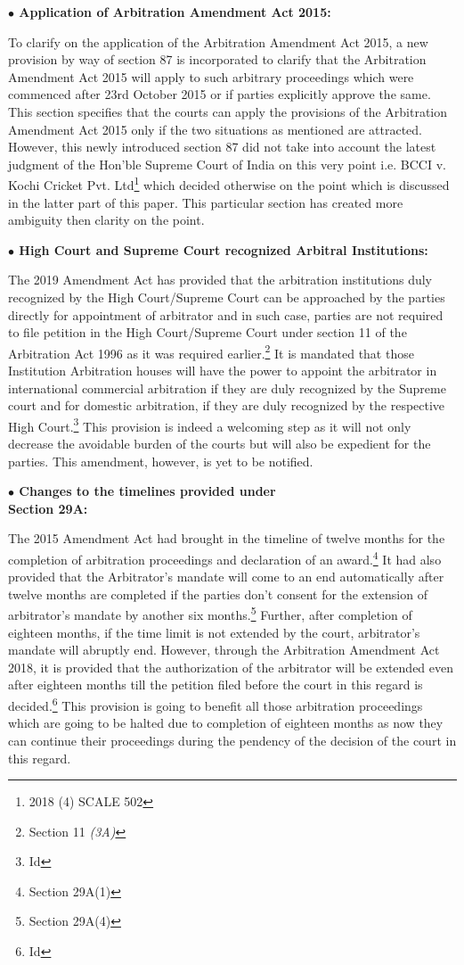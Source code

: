 \begin{multicols}{2}
\noi
{\large \bfseries $\bullet$ Application of Arbitration Amendment Act 2015:}

\noi
To clarify on the application of the Arbitration Amendment Act 2015, a new provision by
way of section 87 is incorporated to clarify that the Arbitration Amendment Act 2015 will
apply to such arbitrary proceedings which were commenced after 23rd October 2015 or if
parties explicitly approve the same. This section specifies that the courts can apply the
provisions of the Arbitration Amendment Act 2015 only if the two situations as mentioned 
are attracted. However, this newly introduced section 87 did not take into account the latest
judgment of the Hon’ble Supreme Court of India on this very point i.e. BCCI v. Kochi
Cricket Pvt. Ltd\footnote{2018 (4) SCALE 502} which decided otherwise on the point which is discussed in the latter part
of this paper. This particular section has created more ambiguity then clarity on the point.

\noi
{\large \bfseries $\bullet$ High Court and Supreme Court recognized Arbitral Institutions:}

\noi
The 2019 Amendment Act has provided that the arbitration institutions duly recognized by
the High Court/Supreme Court can be approached by the parties directly for appointment of
arbitrator and in such case, parties are not required to file petition in the High Court/Supreme
Court under section 11 of the Arbitration Act 1996 as it was required earlier.\footnote{Section 11 \textit{(3A)}} It is mandated
that those Institution Arbitration houses will have the power to appoint the arbitrator in
international commercial arbitration if they are duly recognized by the Supreme court and for
domestic arbitration, if they are duly recognized by the respective High Court.\footnote{Id} This
provision is indeed a welcoming step as it will not only decrease the avoidable burden of the
courts but will also be expedient for the parties. This amendment, however, is yet to be
notified.

\noi
{\large \bfseries $\bullet$ Changes to the timelines provided under\\ Section 29A:}

\noi
The 2015 Amendment Act had brought in the timeline of twelve months for the completion
of arbitration proceedings and declaration of an award.\footnote{Section 29A(1)} It had also provided that the
Arbitrator’s mandate will come to an end automatically after twelve months are completed if
the parties don’t consent for the extension of arbitrator’s mandate by another six months.\footnote{Section 29A(4)}
Further, after completion of eighteen months, if the time limit is not extended by the court,
arbitrator’s mandate will abruptly end. However, through the Arbitration Amendment Act
2018, it is provided that the authorization of the arbitrator will be extended even after
eighteen months till the petition filed before the court in this regard is decided.\footnote{Id} This
provision is going to benefit all those arbitration proceedings which are going to be halted 
due to completion of eighteen months as now they can continue their proceedings during the
pendency of the decision of the court in this regard.


\end{multicols}
